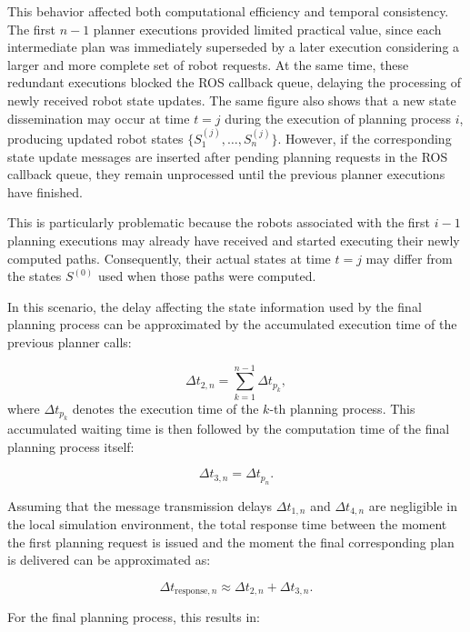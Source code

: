 This behavior affected both computational efficiency and temporal consistency. The first $n-1$ planner executions provided limited practical value, since each intermediate plan was immediately superseded by a later execution considering a larger and more complete set of robot requests. At the same time, these redundant executions blocked the ROS callback queue, delaying the processing of newly received robot state updates. The same figure also shows that a new state dissemination may occur at time $t=j$ 
during the execution of planning process $i$, producing updated robot states 
$\{S_1^{(j)}, \ldots, S_n^{(j)}\}$. However, if the corresponding state update messages are inserted after pending planning requests in the ROS callback queue, they remain unprocessed until the previous planner executions have finished.

This is particularly problematic because the robots associated with the first $i-1$ planning executions may already have received and started executing their newly computed paths. Consequently, their actual states at time $t=j$ may differ from the states $S^{(0)}$ used when those paths were computed. 

In this scenario, the delay affecting the state information used by the final planning process can be approximated by the accumulated execution time of the previous planner calls:

\begin{equation}
    \Delta t_{2,n} = \sum_{k=1}^{n-1} \Delta t_{p_k},
\end{equation}
where $\Delta t_{p_k}$ denotes the execution time of the $k$-th planning process. This accumulated waiting time is then followed by the computation time of the final planning process itself:

\begin{equation}
    \Delta t_{3,n} = \Delta t_{p_n}.
\end{equation}

Assuming that the message transmission delays $\Delta t_{1,n}$ and $\Delta t_{4,n}$ are negligible in the local simulation environment, the total response time between the moment the first planning request is issued and the moment the final corresponding plan is delivered can be approximated as:

\begin{equation}
    \Delta t_{\text{response},n} \approx \Delta t_{2,n} + \Delta t_{3,n}.
\end{equation}

For the final planning process, this results in:

